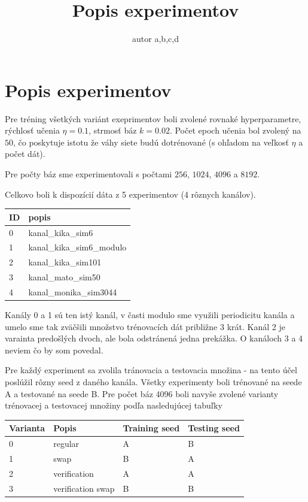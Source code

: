 \documentclass[10pt,a4paper]{article}
\begin{document}
\title{Popis experimentov}
\author{autor a,b,c,d}
\date{}
\maketitle
\thispagestyle{empty}


\section{Popis experimentov}

Pre tréning všetkých variánt exeprimentov boli zvolené rovnaké hyperparametre,
rýchlosť učenia $\eta = 0.1$, strmosť báz $k = 0.02$.
Počet epoch učenia bol zvolený na $50$, čo poskytuje istotu že váhy siete budú dotrénované
(s ohľadom na veľkosť $\eta$ a počet dát).

Pre počty báz sme experimentovali s počtami $256$, $1024$, $4096$ a $8192$.

Celkovo boli k dispozícií dáta z 5 experimentov (4 rôznych kanálov).

\begin{table}[!ht]
\begin{tabular}{|l|l|}
\hline
ID & popis                     \\ \hline
0  & kanal\_kika\_sim6         \\ \hline
1  & kanal\_kika\_sim6\_modulo \\ \hline
2  & kanal\_kika\_sim101       \\ \hline
3  & kanal\_mato\_sim50        \\ \hline
4  & kanal\_monika\_sim3044    \\ \hline
\end{tabular}
\end{table}

Kanály 0 a 1 sú ten istý kanál, v časti modulo sme využili periodicitu kanála
a umelo sme tak zväčšili množstvo trénovacích dát približne 3 krát.
Kanál 2 je varainta predošlých dvoch, ale bola odstránená jedna prekážka.
O kanáloch 3 a 4 neviem čo by som povedal.

Pre každý experiment sa zvolila tránovacia a testovacia množina - na tento účel
poslúžil rôzny seed z daného kanála.
Všetky experimenty boli trénované na seede A a testované na seede B.
Pre počet báz 4096 boli navyše zvolené varianty trénovacej a testovacej množiny podľa nasledujúcej tabuľky

\begin{table}[!ht]
\begin{tabular}{|l|l|l|l|}
\hline
Varianta & Popis             & Training seed & Testing seed \\ \hline
0        & regular           & A             & B            \\ \hline
1        & swap              & B             & A            \\ \hline
2        & verification      & A             & A            \\ \hline
3        & verification swap & B             & B            \\ \hline
\end{tabular}
\end{table}
\end{document}

